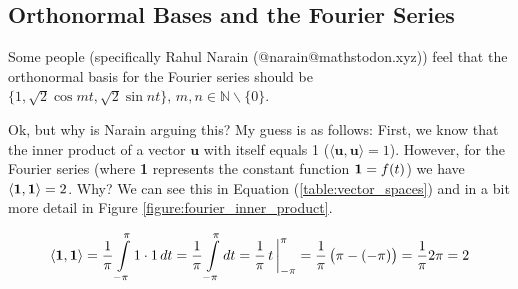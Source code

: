 \documentclass{article}
\theoremstyle{definition}
\begin{document}
\smallskip
\subsection{Orthonormal Bases and the Fourier Series}
Some people (specifically Rahul Narain (@narain@mathstodon.xyz))
feel that the orthonormal basis for the Fourier series should be
$\{1,\sqrt{2} \cos mt,\sqrt{2} \sin nt\}, \, m,n \in \mathbb{N}
\backslash \{0\}$. 

\bigskip
\noindent
Ok, but why is Narain arguing this? My guess is as follows:
First, we know that the inner product of a vector $\mathbf{u}$ 
with itself equals 1 ($\langle \mathbf{u},\mathbf{u} \rangle = 
1$). However, for the Fourier series (where {\bf 1} represents the 
constant function ${\bf 1} = f(t)$) we have $\langle {\bf 1},{\bf 1}
\rangle = 2$. Why? We can see this in Equation (\ref{table:vector_spaces}) 
and in a bit more detail in Figure \ref{figure:fourier_inner_product}.

\begin{equation}
	\langle {\bf 1},{\bf 1} \rangle											= 
		\frac{1}{\pi}\int\limits_{-\pi}^{\pi} 1 \cdot 1 \, dt	= 
		\frac{1}{\pi}\int\limits_{-\pi}^{\pi} dt				= 
		\frac{1}{\pi}  \, t \, \bigg |^{\pi}_{-\pi}				= 
		\frac{1}{\pi} \left (\pi - (-\pi) \right )				= 
		\frac{1}{\pi} 2\pi										= 
		2
\label{eqn:1}
\end{equation}
\end{document}
